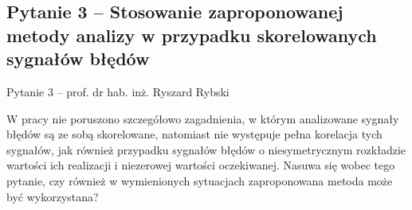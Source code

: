 \documentclass[12pt, polish, aspectratio = 169]{slides}
\begin{document}
\subsection{Pytanie 3 -- Stosowanie zaproponowanej metody analizy w przypadku skorelowanych sygnałów błędów}

\begin{frame}{Pytanie 3 -- prof. dr hab. inż. Ryszard Rybski}\large
\begin{justify}
W pracy nie poruszono szczegółowo zagadnienia, w którym analizowane sygnały błędów są ze sobą skorelowane, natomiast nie występuje pełna korelacja tych sygnałów, jak również przypadku sygnałów błędów o niesymetrycznym rozkładzie wartości ich realizacji i niezerowej wartości oczekiwanej. Nasuwa się wobec tego pytanie, czy również w wymienionych sytuacjach zaproponowana metoda może być wykorzystana?
\end{justify}
\end{frame}
\end{document}
